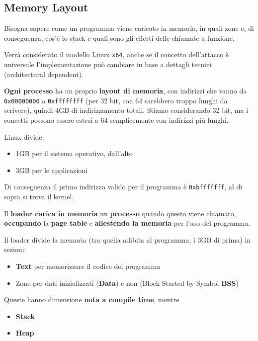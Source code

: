\subsection{Memory Layout}

Bisogna sapere come un programma viene caricato in memoria, in quali zone e, di conseguenza, cos'è lo stack e quali sono gli effetti delle chiamate a funzione. 

Verrà considerato il modello Linux \texttt{x64}, anche se il concetto dell'attacco è universale l'implementazione può cambiare in base a dettagli tecnici (architectural dependent).

\textbf{Ogni processo} ha un proprio \textbf{layout di memoria}, con indirizzi che vanno da \texttt{0x00000000} a \texttt{0xffffffff} (per 32 bit, con 64 sarebbero troppo lunghi da scrivere), quindi 4GB di indirizzamento totali. Stiamo considerando 32 bit, ma i concetti possono essere estesi a 64 semplicemente con indirizzi più lunghi.

Linux divide:
\begin{itemize}
	\item 1GB per il sistema operativo, dall'alto
    
	\item 3GB per le applicazioni
\end{itemize}

Di conseguenza il primo indirizzo valido per il programma è \texttt{0xbfffffff}, al di sopra si trova il kernel.

Il \textbf{loader carica in memoria} un \textbf{processo} quando questo viene chiamato, \textbf{occupando} la \textbf{page table} e \textbf{allestendo la memoria} per l'uso del programma. 

Il loader divide la memoria (tra quella adibita al programma, i 3GB di prima) in sezioni:
\begin{itemize}
	\item \textbf{Text} per memorizzare il codice del programma
	
    \item Zone per dati inizializzati (\textbf{Data}) e non (Block Started by Symbol \textbf{BSS})
\end{itemize}

Queste hanno dimensione \textbf{nota a compile time}, mentre
\begin{itemize}
	\item \textbf{Stack}

	\item \textbf{Heap}
\end{itemize}

